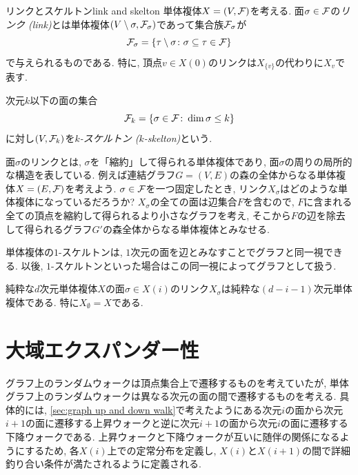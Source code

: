 \begin{definition}{リンクとスケルトン}{link and skelton}
    単体複体$X=(V,\F)$を考える.
    面$\sigma \in \F$の\emph{リンク (link)}とは単体複体$(V\setminus \sigma, \F_{\sigma})$であって集合族$\F_\sigma$が
    \[
        \F_\sigma = \cbra*{ \tau \setminus \sigma \colon \sigma \subseteq \tau \in \F }
    \]
    で与えられるものである.
    特に, 頂点$v\in X(0)$のリンクは$X_{\{v\}}$の代わりに$X_v$で表す.

    次元$k$以下の面の集合
    \[
        \F_k = \cbra*{ \sigma \in \F \colon \dim \sigma \le k}
    \]
    に対し$(V,\F_k)$を\emph{$k$-スケルトン ($k$-skelton)}という.
\end{definition}
面$\sigma$のリンクとは, $\sigma$を「縮約」して得られる単体複体であり, 面$\sigma$の周りの局所的な構造を表している.
例えば連結グラフ$G=(V,E)$の森の全体からなる単体複体$X=(E,\F)$を考えよう.
$\sigma\in \F$を一つ固定したとき, リンク$X_\sigma$はどのような単体複体になっているだろうか?
$X_\sigma$の全ての面は辺集合$F$を含むので, $F$に含まれる全ての頂点を縮約して得られるより小さなグラフを考え, そこから$F$の辺を除去して得られるグラフ$G'$の森全体からなる単体複体とみなせる.

単体複体の$1$-スケルトンは, $1$次元の面を辺とみなすことでグラフと同一視できる.
以後, $1$-スケルトンといった場合はこの同一視によってグラフとして扱う.

純粋な$d$次元単体複体$X$の面$\sigma\in X(i)$のリンク$X_\sigma$は純粋な$(d-i-1)$次元単体複体である.
特に$X_\emptyset = X$である.

\section{大域エクスパンダー性}
グラフ上のランダムウォークは頂点集合上で遷移するものを考えていたが,
単体グラフ上のランダムウォークは異なる次元の面の間で遷移するものを考える.
具体的には, \cref{sec:graph up and down walk}で考えたようにある次元$i$の面から次元$i+1$の面に遷移する上昇ウォークと逆に次元$i+1$の面から次元$i$の面に遷移する下降ウォークである.
上昇ウォークと下降ウォークが互いに随伴の関係になるようにするため, 各$X(i)$上での定常分布を定義し, $X(i)$と$X(i+1)$の間で詳細釣り合い条件が満たされるように定義される.

